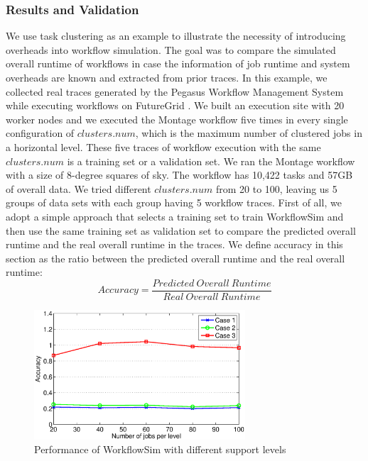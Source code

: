 \subsubsection{Results and Validation}
We use task clustering as an example to illustrate the necessity of introducing overheads into workflow simulation. The goal was to compare the simulated overall runtime of workflows in case the information of job runtime and system overheads are known and extracted from prior traces. 
In this example, we collected real traces generated by the Pegasus Workflow Management System while executing workflows on FutureGrid \cite{Fox2013FutureGrid}. We built an execution site with 20 worker nodes and we executed the Montage workflow five times in every single configuration of $clusters.num$, which is the maximum number of clustered jobs in a horizontal level. These five traces of workflow execution with the same $clusters.num$ is a training set or a validation set. 
We ran the Montage workflow with a size of 8-degree squares of sky. The workflow has 10,422 tasks and 57GB of overall data. We tried different $clusters.num$ from 20 to 100, leaving us 5 groups of data sets with each group having 5 workflow traces. 
First of all, we adopt a simple approach that selects a training set to train WorkflowSim and then use the same training set as validation set to compare the predicted overall runtime and the real overall runtime in the traces. We define accuracy in this section as the ratio between the predicted overall runtime and the real overall runtime:
\begin{equation} \label{eq:model_wfs_accuracy}
Accuracy=\frac{Predicted~Overall~Runtime}{Real~Overall~Runtime}
\end{equation}
 \begin{figure}[h!]
	\centering
    \includegraphics[width=0.7\textwidth]{figures/model/wfs_levels.eps}
    \caption{Performance of WorkflowSim with different support levels}
    \label{fig:model_wfs_levels}
\end{figure} 
 
